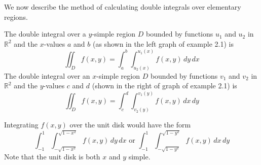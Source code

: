   We now describe the method of calculating double integrals over elementary regions. 

	\begin{theorem}
	  \label{thm:iterated-integrals-over-simple-regions}
		The double integral over a $y$-simple region $D$ bounded by functions $u_1$ and $u_2$ in $\mathbb{R}^2$ and the $x$-values $a$ and $b$ (as shown in the left graph of example 2.1) is
		\begin{equation}
			\iint_D f(x, y) = \int_a^b \int_{u_2 (x)}^{u_1 (x)} f(x, y) \, dy \, dx
		\end{equation}
		The double integral over an $x$-simple region $D$ bounded by functions $v_1$ and $v_2$ in $\mathbb{R}^2$ and the $y$-values $c$ and $d$ (shown in the right of graph of example 2.1) is 
		\begin{equation}
			\iint_D f(x, y) = \int_c^d \int_{v_2 (y)}^{v_1 (y)} f(x, y) \, dx \, dy
		\end{equation}
  \end{theorem}

	\begin{example}
	  \label{ex:unit-disk}
		Integrating $f(x, y)$ over the unit disk would have the form
		\begin{equation}
			\int_{-1}^1 \int_{-\sqrt{1-x^2}}^{\sqrt{1-x^2}} f(x,y) \, dy\, dx \text{ or } \int_{-1}^1 \int_{-\sqrt{1-y^2}}^{\sqrt{1-y^2}} f(x,y) \, dx\, dy 
		\end{equation}
		Note that the unit disk is both $x$ and $y$ simple. 
  \end{example}

